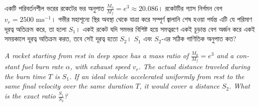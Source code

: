 \documentclass[12pt, a4paper]{article}
\begin{document}
\begin{tcolorbox}[questionbox={প্রশ্ন (Question) 6}]
\noindent
একটি পরিবর্তনশীল ভরের রকেটের ভর অনুপাত $\frac{M_0}{M_f} = e^3 \approx 20.086$। রকেটটির গ্যাস নির্গমন বেগ $v_r = 2500\text{ ms}^{-1}$। গভীর মহাশূন্যে স্থির অবস্থা থেকে যাত্রা করে সম্পূর্ণ জ্বালানি শেষ হওয়া পর্যন্ত এটি যে পরিমাণ দূরত্ব অতিক্রম করে, তা হলো $S_1$। একই রকেট যদি সমভর বিশিষ্ট হয়ে সমত্বরণে একই চূড়ান্ত বেগ অর্জন করে একই সময়কালে দূরত্ব অতিক্রম করত, তবে সেই দূরত্ব হতো $S_2$। $S_1$ এবং $S_2$-এর সঠিক গাণিতিক অনুপাত কত?

\vspace{0.8em}
\begin{english}
\noindent\textit{\color{darkgray}
A rocket starting from rest in deep space has a mass ratio of $\frac{M_0}{M_f} = e^3$ and a constant fuel burn rate $\alpha$, with exhaust speed $v_r$. The actual distance traveled during the burn time $T$ is $S_1$. If an ideal vehicle accelerated uniformly from rest to the same final velocity over the same duration $T$, it would cover a distance $S_2$. What is the exact ratio $\frac{S_1}{S_2}$?
}
\end{english}
\end{tcolorbox}

\vspace{1em}
\begin{center}
\end{center}
\vspace{1em}
\end{document}
